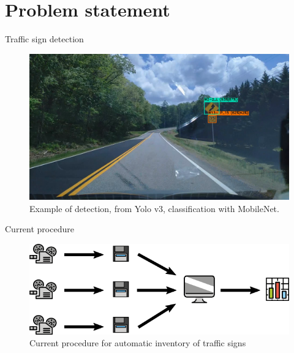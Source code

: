 \documentclass{beamer}
\begin{document}

\section{Problem statement}
\begin{frame}{Traffic sign detection}
    \begin{figure}
        \centering
        \includegraphics[width=.95\linewidth]{figures/yolo_detection_example.png}
        \caption{Example of detection, from Yolo v3, classification with MobileNet.}
    \end{figure}{}
\end{frame}{}

\begin{frame}{Current procedure}
    \begin{figure}
        \centering
        \includegraphics[width=0.8\linewidth]{figures/self_made/current.png}
        \caption{Current procedure for automatic inventory of traffic signs}
    \end{figure}{}
\end{frame}{}
\end{document}
